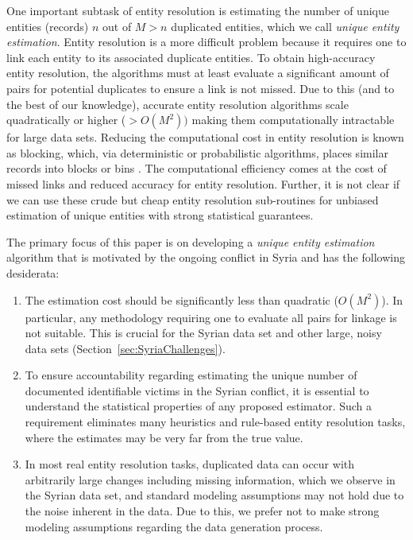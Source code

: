\documentclass{imsart}
\begin{document}
One important subtask of entity resolution is estimating the number of unique entities (records) $n$ out of $M > n$ duplicated entities, which we call \emph{unique entity estimation}. Entity resolution is a more difficult problem because it requires one to link each entity to its associated duplicate entities. To obtain high-accuracy entity resolution, the algorithms must at least evaluate a significant amount of pairs for potential duplicates to ensure a link is not missed. Due to this (and to the best of our knowledge), accurate entity resolution algorithms scale quadratically or higher ($> O(M^2))$ making them computationally intractable for large data sets.  Reducing the computational cost in entity resolution is known as blocking, which, via deterministic or probabilistic algorithms, places similar records into blocks or bins \citep{christen_2012, steorts14comparison}. The computational efficiency comes at the cost of missed links and reduced accuracy for entity resolution. Further, it is not clear if we can use these crude but cheap entity resolution sub-routines for unbiased estimation of unique entities with strong statistical guarantees.

The primary focus of this paper is on developing a \emph{unique entity estimation} algorithm that is motivated by the ongoing conflict in Syria and has the following desiderata:
\begin{enumerate}
  \item The estimation cost should be significantly less than quadratic ($O(M^2)$). In particular, any methodology requiring one to evaluate all pairs for linkage is not suitable. This is crucial for the Syrian data set and other large, noisy data sets (Section~\ref{sec:SyriaChallenges}).
  \item To ensure accountability regarding estimating the unique number of documented identifiable victims in the Syrian conflict, it is essential to understand the statistical properties of any proposed estimator. Such a requirement eliminates many heuristics and rule-based entity resolution tasks, where the estimates may be very far from the true value.
  \item  In most real entity resolution tasks, duplicated data can occur with arbitrarily large changes including missing information, which we observe in the Syrian data set, and standard modeling assumptions may not hold due to the noise inherent in the data. Due to this, we prefer not to make strong modeling assumptions regarding the data generation process.
\end{enumerate}
\end{document}
